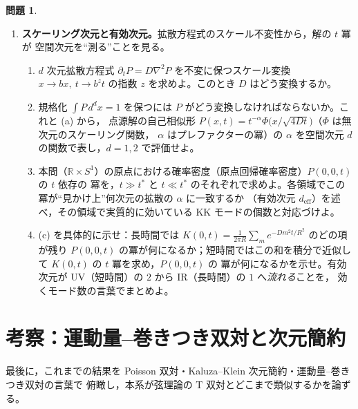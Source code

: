 \documentclass[dvipdfmx, uplatex]{jsarticle}
\theoremstyle{definition}
\newtheorem*{prob}{問題}
\begin{document}
\begin{prob}
\begin{enumerate}[start=16]
\item \textbf{スケーリング次元と有効次元。}拡散方程式のスケール不変性から，解の $t$ 冪が
空間次元を``測る''ことを見る。
\begin{enumerate}
\item $d$ 次元拡散方程式 $\partial_t P=D\nabla^2P$ を不変に保つスケール変換
$x\to bx,\ t\to b^z t$ の指数 $z$ を求めよ。このとき $D$ はどう変換するか。
\item 規格化 $\int P\,d^dx=1$ を保つには $P$ がどう変換しなければならないか。これと (a) から，
点源解の自己相似形 $P(x,t)=t^{-\alpha}\Phi\!\bigl(x/\sqrt{4Dt}\bigr)$（$\Phi$ は無次元のスケーリング関数，
$\alpha$ はプレファクターの冪）の $\alpha$ を空間次元 $d$ の関数で表し，$d=1,2$ で評価せよ。
\item 本問（$\mathbb{R}\times S^1$）の原点における確率密度（原点回帰確率密度）$P(0,0,t)$ の $t$ 依存の
冪を，$t\gg t^\ast$ と
$t\ll t^\ast$ のそれぞれで求めよ。各領域でこの冪が``見かけ上''何次元の拡散の $\alpha$ に一致するか
（有効次元 $d_{\mathrm{eff}}$）を述べ，その領域で実質的に効いている KK モードの個数と対応づけよ。
\item (c) を具体的に示せ：長時間では $K(0,t)=\frac{1}{2\pi R}\sum_m e^{-Dm^2t/R^2}$ のどの項が残り
$P(0,0,t)$ の冪が何になるか；短時間ではこの和を積分で近似して $K(0,t)$ の $t$ 冪を求め，$P(0,0,t)$ の
冪が何になるかを示せ。有効次元が UV（短時間）の $2$ から IR（長時間）の $1$ へ\emph{流れる}ことを，
効くモード数の言葉でまとめよ。
\end{enumerate}
\end{enumerate}
\end{prob}

\section{考察：運動量--巻きつき双対と次元簡約}
最後に，これまでの結果を Poisson 双対・Kaluza--Klein 次元簡約・運動量--巻きつき双対の言葉で
俯瞰し，本系が弦理論の T 双対とどこまで類似するかを論ずる。
\end{document}
